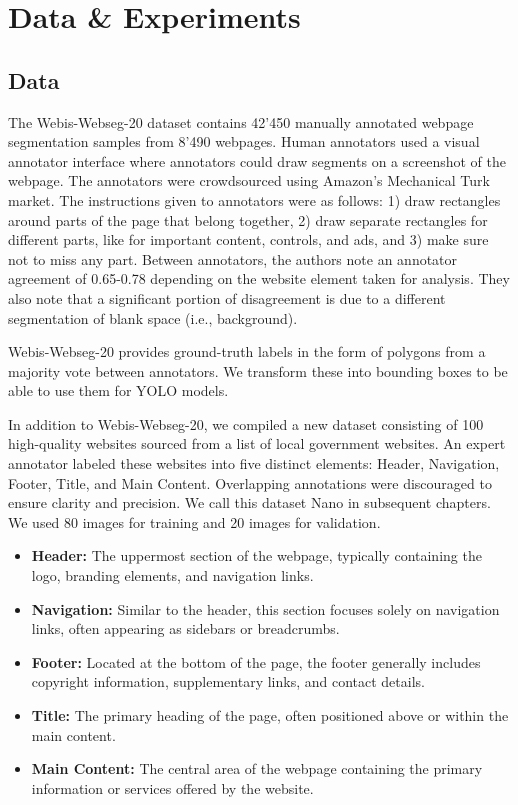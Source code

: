 \documentclass[conference]{IEEEtran}
\begin{document}
\section{Data \& Experiments}

\subsection{Data}

The Webis-Webseg-20 dataset contains 42'450 manually annotated webpage segmentation samples from 8'490 webpages. Human annotators used a visual annotator interface where annotators could draw segments on a screenshot of the webpage. The annotators were crowdsourced using Amazon's Mechanical Turk market. The instructions given to annotators were as follows: 1) draw rectangles around parts of the page that belong together, 2) draw separate rectangles for different parts, like for important content, controls, and ads, and 3) make sure not to miss any part. Between annotators, the authors note an annotator agreement of 0.65-0.78 depending on the website element taken for analysis. They also note that a significant portion of disagreement is due to a different segmentation of blank space (i.e., background). 

Webis-Webseg-20 provides ground-truth labels in the form of polygons from a majority vote between annotators. We transform these into bounding boxes to be able to use them for YOLO models. 

In addition to Webis-Webseg-20, we compiled a new dataset consisting of 100 high-quality websites sourced from a list of local government websites. An expert annotator labeled these websites into five distinct elements: Header, Navigation, Footer, Title, and Main Content. Overlapping annotations were discouraged to ensure clarity and precision. We call this dataset Nano in subsequent chapters. We used 80 images for training and 20 images for validation.

\begin{itemize}
\item \textbf{Header:} The uppermost section of the webpage, typically containing the logo, branding elements, and navigation links.
\item \textbf{Navigation:} Similar to the header, this section focuses solely on navigation links, often appearing as sidebars or breadcrumbs.
\item \textbf{Footer:} Located at the bottom of the page, the footer generally includes copyright information, supplementary links, and contact details.
\item \textbf{Title:} The primary heading of the page, often positioned above or within the main content.
\item \textbf{Main Content:} The central area of the webpage containing the primary information or services offered by the website.
\end{itemize}
\end{document}
